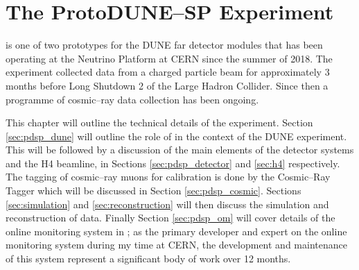 \chapter{\label{ch:protodune}The ProtoDUNE--SP Experiment} 

%
% 

\minitoc

\protodune{} is one of two prototypes for the DUNE far detector modules that has
been operating at the Neutrino Platform at CERN since the summer of 2018. The
experiment collected data from a charged particle beam for approximately 3 
months before Long Shutdown 2 of the Large Hadron Collider. Since then a 
programme of cosmic--ray data collection has been ongoing.

This chapter will outline the technical details of the \protodune{} experiment.
Section \ref{sec:pdsp_dune} will outline the role of \protodune{} in the context
of the DUNE experiment. This will be followed by a discussion of the main
elements of the \protodune{} detector systems and the H4 beamline, in Sections 
\ref{sec:pdsp_detector} and \ref{sec:h4} respectively. The tagging of 
cosmic--ray muons for calibration is done by the Cosmic--Ray Tagger which will 
be discussed in Section \ref{sec:pdsp_cosmic}. Sections \ref{sec:simulation} 
and \ref{sec:reconstruction} will then discuss the simulation and 
reconstruction of \protodune{} data. Finally Section \ref{sec:pdsp_om} will 
cover details of the online monitoring system in \protodune{}; as the primary 
developer and expert on the \protodune{} online monitoring system during my 
time at CERN, the development and maintenance of this system represent a 
significant body of work over 12 months.  

